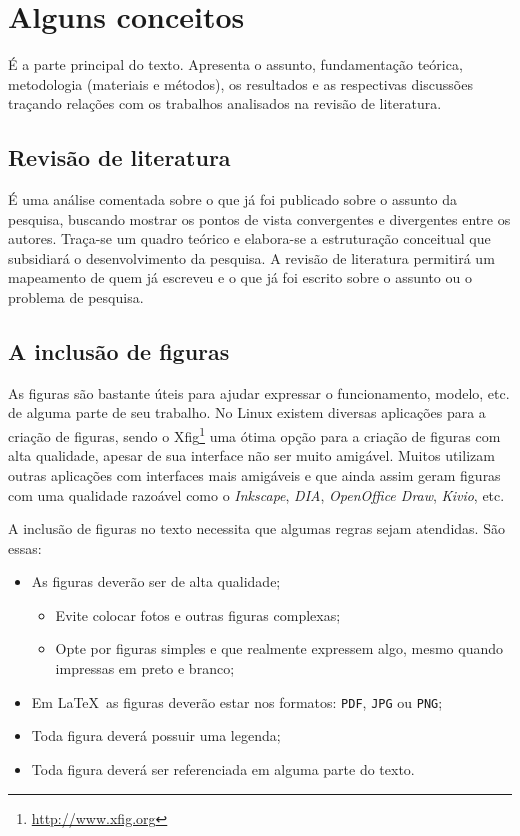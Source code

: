\chapter{Alguns conceitos}
\label{c_cap2}

É a parte principal do texto. Apresenta o assunto, fundamentação teórica, metodologia (materiais e métodos), os resultados e as respectivas discussões traçando relações com os trabalhos analisados na revisão de literatura.

\section{Revisão de literatura}\label{s_c2_revisao}

É uma análise comentada sobre o que já foi publicado sobre o assunto da pesquisa, buscando mostrar os pontos de vista convergentes e divergentes entre os autores. Traça-se um quadro teórico e elabora-se a estruturação conceitual que subsidiará o desenvolvimento da pesquisa. A revisão de literatura permitirá um mapeamento de quem já escreveu e o que já foi escrito sobre o assunto ou o problema de pesquisa.


\section{A inclusão de figuras}
\label{s_c2_figuras}

As figuras são bastante úteis para ajudar expressar o funcionamento, modelo, etc. de alguma parte de seu trabalho. No Linux existem diversas aplicações para a criação de figuras, sendo o Xfig\footnote{\url{http://www.xfig.org}} uma ótima opção para a criação de figuras com alta qualidade, apesar de sua interface não ser muito amigável. Muitos utilizam outras aplicações com interfaces mais amigáveis e que ainda assim geram figuras com uma qualidade razoável como o \textit{Inkscape}, \textit{DIA}, \textit{OpenOffice Draw}, \textit{Kivio}, etc.

A inclusão de figuras no texto necessita que algumas regras sejam atendidas. São essas:

\begin{itemize}
	\item As figuras deverão ser de alta qualidade;
	\begin{itemize}
		\item Evite colocar fotos e outras figuras complexas;
		\item Opte por figuras simples e que realmente expressem algo, mesmo quando impressas em preto e branco;
	\end{itemize}
	\item Em \LaTeX~as figuras deverão estar nos formatos: \texttt{PDF}, \texttt{JPG} ou \texttt{PNG};
	\item Toda figura deverá possuir uma legenda;
	\item Toda figura deverá ser referenciada em alguma parte do texto.
\end{itemize}

